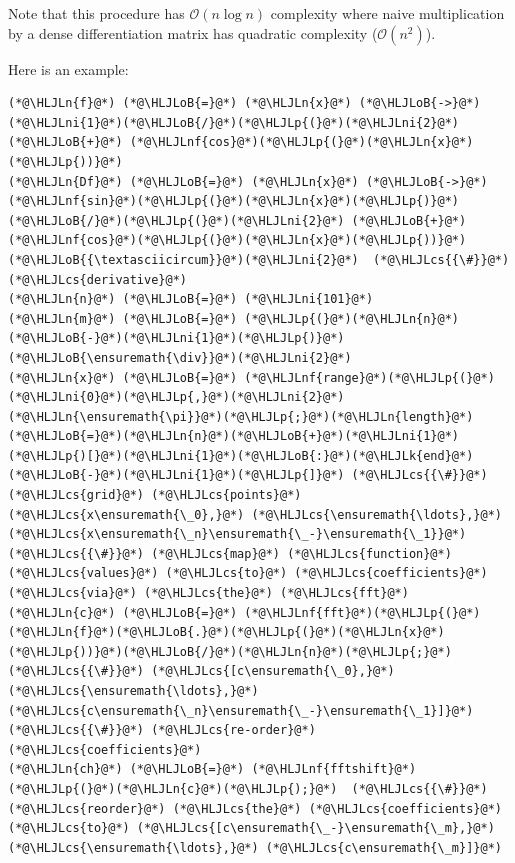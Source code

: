 \documentclass[12pt,landscape]{article}
\newcommand{\HLJLk}[1]{\textcolor[RGB]{148,91,176}{\textbf{#1}}}
\newcommand{\HLJLn}[1]{#1}
\newcommand{\HLJLnf}[1]{\textcolor[RGB]{66,102,213}{#1}}
\newcommand{\HLJLni}[1]{\textcolor[RGB]{59,151,46}{#1}}
\newcommand{\HLJLoB}[1]{\textcolor[RGB]{102,102,102}{\textbf{#1}}}
\newcommand{\HLJLp}[1]{#1}
\newcommand{\HLJLcs}[1]{\textcolor[RGB]{153,153,119}{\textit{#1}}}
\begin{document}
{\begin{itemize}
\end{itemize}
Note that this procedure has $\mathcal{O}(n \log n)$ complexity where naive multiplication by a dense differentiation matrix has quadratic complexity ($\mathcal{O}\left(n^2\right)$).

Here is an example:


\begin{lstlisting}
(*@\HLJLn{f}@*) (*@\HLJLoB{=}@*) (*@\HLJLn{x}@*) (*@\HLJLoB{->}@*) (*@\HLJLni{1}@*)(*@\HLJLoB{/}@*)(*@\HLJLp{(}@*)(*@\HLJLni{2}@*) (*@\HLJLoB{+}@*) (*@\HLJLnf{cos}@*)(*@\HLJLp{(}@*)(*@\HLJLn{x}@*)(*@\HLJLp{))}@*)
(*@\HLJLn{Df}@*) (*@\HLJLoB{=}@*) (*@\HLJLn{x}@*) (*@\HLJLoB{->}@*) (*@\HLJLnf{sin}@*)(*@\HLJLp{(}@*)(*@\HLJLn{x}@*)(*@\HLJLp{)}@*)(*@\HLJLoB{/}@*)(*@\HLJLp{(}@*)(*@\HLJLni{2}@*) (*@\HLJLoB{+}@*) (*@\HLJLnf{cos}@*)(*@\HLJLp{(}@*)(*@\HLJLn{x}@*)(*@\HLJLp{))}@*)(*@\HLJLoB{{\textasciicircum}}@*)(*@\HLJLni{2}@*)  (*@\HLJLcs{{\#}}@*) (*@\HLJLcs{derivative}@*)
(*@\HLJLn{n}@*) (*@\HLJLoB{=}@*) (*@\HLJLni{101}@*)
(*@\HLJLn{m}@*) (*@\HLJLoB{=}@*) (*@\HLJLp{(}@*)(*@\HLJLn{n}@*)(*@\HLJLoB{-}@*)(*@\HLJLni{1}@*)(*@\HLJLp{)}@*)(*@\HLJLoB{\ensuremath{\div}}@*)(*@\HLJLni{2}@*)
(*@\HLJLn{x}@*) (*@\HLJLoB{=}@*) (*@\HLJLnf{range}@*)(*@\HLJLp{(}@*)(*@\HLJLni{0}@*)(*@\HLJLp{,}@*)(*@\HLJLni{2}@*)(*@\HLJLn{\ensuremath{\pi}}@*)(*@\HLJLp{;}@*)(*@\HLJLn{length}@*)(*@\HLJLoB{=}@*)(*@\HLJLn{n}@*)(*@\HLJLoB{+}@*)(*@\HLJLni{1}@*)(*@\HLJLp{)[}@*)(*@\HLJLni{1}@*)(*@\HLJLoB{:}@*)(*@\HLJLk{end}@*)(*@\HLJLoB{-}@*)(*@\HLJLni{1}@*)(*@\HLJLp{]}@*) (*@\HLJLcs{{\#}}@*) (*@\HLJLcs{grid}@*) (*@\HLJLcs{points}@*) (*@\HLJLcs{x\ensuremath{\_0},}@*) (*@\HLJLcs{\ensuremath{\ldots},}@*) (*@\HLJLcs{x\ensuremath{\_n}\ensuremath{\_-}\ensuremath{\_1}}@*)
(*@\HLJLcs{{\#}}@*) (*@\HLJLcs{map}@*) (*@\HLJLcs{function}@*) (*@\HLJLcs{values}@*) (*@\HLJLcs{to}@*) (*@\HLJLcs{coefficients}@*) (*@\HLJLcs{via}@*) (*@\HLJLcs{the}@*) (*@\HLJLcs{fft}@*)
(*@\HLJLn{c}@*) (*@\HLJLoB{=}@*) (*@\HLJLnf{fft}@*)(*@\HLJLp{(}@*)(*@\HLJLn{f}@*)(*@\HLJLoB{.}@*)(*@\HLJLp{(}@*)(*@\HLJLn{x}@*)(*@\HLJLp{))}@*)(*@\HLJLoB{/}@*)(*@\HLJLn{n}@*)(*@\HLJLp{;}@*) (*@\HLJLcs{{\#}}@*) (*@\HLJLcs{[c\ensuremath{\_0},}@*) (*@\HLJLcs{\ensuremath{\ldots},}@*) (*@\HLJLcs{c\ensuremath{\_n}\ensuremath{\_-}\ensuremath{\_1}]}@*)
(*@\HLJLcs{{\#}}@*) (*@\HLJLcs{re-order}@*) (*@\HLJLcs{coefficients}@*)
(*@\HLJLn{ch}@*) (*@\HLJLoB{=}@*) (*@\HLJLnf{fftshift}@*)(*@\HLJLp{(}@*)(*@\HLJLn{c}@*)(*@\HLJLp{);}@*)  (*@\HLJLcs{{\#}}@*) (*@\HLJLcs{reorder}@*) (*@\HLJLcs{the}@*) (*@\HLJLcs{coefficients}@*) (*@\HLJLcs{to}@*) (*@\HLJLcs{[c\ensuremath{\_-}\ensuremath{\_m},}@*) (*@\HLJLcs{\ensuremath{\ldots},}@*) (*@\HLJLcs{c\ensuremath{\_m}]}@*)

\end{lstlisting}}
\end{document}
